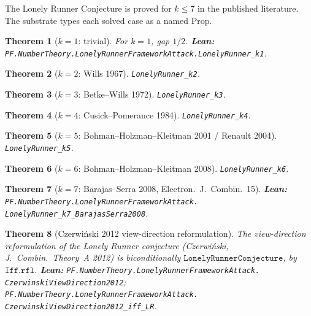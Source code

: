 \documentclass[11pt,a4paper]{article}
\theoremstyle{plain}
\newtheorem{theorem}{Theorem}[section]
\theoremstyle{definition}
\begin{document}
The Lonely Runner Conjecture is proved for $k \le 7$ in the published
literature. The substrate types each solved case as a named Prop.

\begin{theorem}[$k=1$: trivial]
\label{thm:k1}
For $k=1$, gap $1/2$. \textbf{Lean:}
\texttt{PF.NumberTheory.LonelyRunnerFrameworkAttack.LonelyRunner\_k1}.
\end{theorem}

\begin{theorem}[$k=2$: Wills 1967]
\label{thm:k2}
\texttt{LonelyRunner\_k2}.
\end{theorem}

\begin{theorem}[$k=3$: Betke--Wills 1972]
\label{thm:k3}
\texttt{LonelyRunner\_k3}.
\end{theorem}

\begin{theorem}[$k=4$: Cusick--Pomerance 1984]
\label{thm:k4}
\texttt{LonelyRunner\_k4}.
\end{theorem}

\begin{theorem}[$k=5$: Bohman--Holzman--Kleitman 2001 / Renault 2004]
\label{thm:k5}
\texttt{LonelyRunner\_k5}.
\end{theorem}

\begin{theorem}[$k=6$: Bohman--Holzman--Kleitman 2008]
\label{thm:k6}
\texttt{LonelyRunner\_k6}.
\end{theorem}

\begin{theorem}[$k=7$: Barajas--Serra 2008, Electron.\ J.\ Combin.\ 15]
\label{thm:k7}
\textbf{Lean:}
\texttt{PF.NumberTheory.LonelyRunnerFrameworkAttack.\\
LonelyRunner\_k7\_BarajasSerra2008}.
\end{theorem}

\begin{theorem}[Czerwiński 2012 view-direction reformulation]
\label{thm:czerwinski}
The view-direction reformulation of the Lonely Runner conjecture
(Czerwiński, J.~Combin.\ Theory~A 2012) is biconditionally
$\mathtt{LonelyRunnerConjecture}$, by $\mathtt{Iff.rfl}$.
\textbf{Lean:}
\texttt{PF.NumberTheory.LonelyRunnerFrameworkAttack.\\
CzerwinskiViewDirection2012};
\texttt{PF.NumberTheory.LonelyRunnerFrameworkAttack.\\
CzerwinskiViewDirection2012\_iff\_LR}.
\end{theorem}
\end{document}
